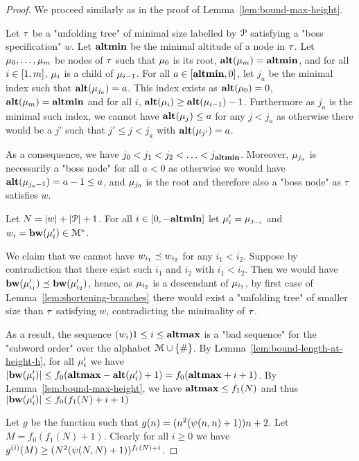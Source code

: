 \begin{proof}
	We proceed similarly as in the proof of Lemma~\ref{lem:bound-max-height}. 
	
	Let $\tau$ be a "unfolding tree" of minimal size labelled by $\mathcal{P}$ satisfying a "boss specification" $w$. Let $\mathbf{altmin}$ be the minimal altitude of a node in $\tau$. Let $\mu_0, \ldots, \mu_m$ be nodes of $\tau$ such that $\mu_0$ is its root, $\mathbf{alt}(\mu_m) = \mathbf{altmin}$, and for all $i\in [1,m]$, $\mu_i$ is a child of $\mu_{i-1}$.
	For all $a \in [\mathbf{altmin},0]$, let $j_a$ be the minimal index such that $\mathbf{alt}(\mu_{j_a}) = a$. This index exists as $\mathbf{alt}(\mu_0) = 0$, $\mathbf{alt}(\mu_m) = \mathbf{altmin}$ and for all $i$, $\mathbf{alt}(\mu_{i}) \geq \mathbf{alt}(\mu_{i-1})-1$.
	Furthermore as $j_a$ is the minimal such index, we cannot have $\mathbf{alt}(\mu_j) \leq a$ for any $j < j_a$ as otherwise there would be a $j'$ such that $j' \leq j < j_a$ with $\mathbf{alt}(\mu_{j'}) = a$.
	
	As a consequence, we have $j_0 < j_1 < j_2 < \ldots < j_{\mathbf{altmin}}$. Moreover, $\mu_{j_a}$ is necessarily a "boss node" for all $a<0$ as otherwise we would have $\mathbf{alt}(\mu_{j_a-1}) = a-1 \leq a$, and $\mu_{j_0}$ is the root and therefore also a "boss node" as $\tau$ satisfies $w$.
	
	Let $N = |w| + |\mathcal{P}|+1$. For all $i \in [0,-\mathbf{altmin}]$ let $\mu'_i = \mu_{j_{-i}}$ and $w_i = \mathbf{bw}(\mu'_{i}) \in \mathcal{M}^*$.
	
	We claim that we cannot have $w_{i_1}\preceq w_{i_2}$ for any  $i_1< i_2$.
	Suppose by contradiction that there exist such $i_1$ and $i_2$ with $i_1 < i_2$. Then we would have $\mathbf{bw}(\mu'_{i_1}) \preceq \mathbf{bw}(\mu'_{i_2})$, hence, as $\mu_{i_2}$ is a descendant of $\mu_{i_1}$, by first case of Lemma~\ref{lem:shortening-branches} there would exist a "unfolding tree" of smaller size than $\tau$ satisfying $w$, contradicting the minimality of $\tau$.
	
	As a result, the sequence $(w_i){1\leq i \leq \mathbf{altmax}}$ is a "bad sequence" for the "subword order" over the alphabet $\mathcal{M}\cup\{\#\}$.
	By Lemma~\ref{lem:bound-length-at-height-h}, for all $\mu'_i$ we have $|\mathbf{bw}(\mu'_i)| \leq f_0(\mathbf{altmax} - \mathbf{alt}(\mu'_i)+1) = f_0(\mathbf{altmax} +i+1)$.
	By Lemma~\ref{lem:bound-max-height}, we have $\mathbf{altmax} \leq f_1(N)$ and thus $|\mathbf{bw}(\mu'_i)| \leq  f_0(f_1(N) +i+1)$
	
	Let $g$ be the function such that $g(n) = (n^2(\psi(n,n)+1))n+2$. 
	Let $M = f_0(f_1(N)+1)$. Clearly for all $i\geq 0$ we have $g^{(i)}(M) \geq (N^2(\psi(N,N)+1))^{f_1(N) + i}$.
	

\end{proof}
